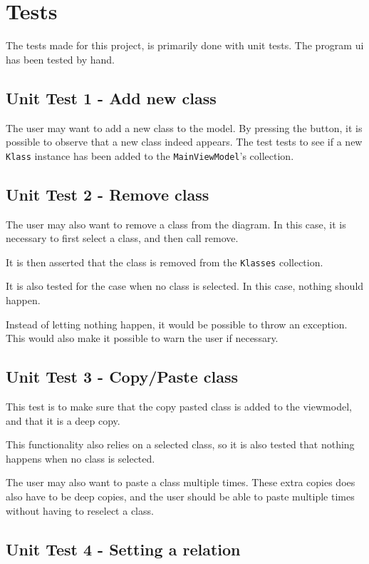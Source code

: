 \section{Tests}

The tests made for this project, is primarily done with unit
tests. The program ui has been tested by hand.

\subsection{Unit Test 1 - Add new class}

The user may want to add a new class to the model. By pressing the button, it is
possible to observe that a new class indeed appears. The test tests to see if a
new \texttt{Klass} instance has been added to the \texttt{MainViewModel}'s
collection.

\subsection{Unit Test 2 - Remove class}

The user may also want to remove a class from the diagram. In this case, it is
necessary to first select a class, and then call remove.

It is then asserted that the class is removed from the \texttt{Klasses}
collection.

It is also tested for the case when no class is selected. In this case, nothing
should happen.

Instead of letting nothing happen, it would be possible to throw an exception.
This would also make it possible to warn the user if necessary.

\subsection{Unit Test 3 - Copy/Paste class}

This test is to make sure that the copy pasted class is added to the viewmodel,
and that it is a deep copy.

This functionality also relies on a selected class, so it is also tested that
nothing happens when no class is selected.

The user may also want to paste a class multiple times. These extra copies does
also have to be deep copies, and the user should be able to paste multiple times
without having to reselect a class.


\subsection{Unit Test 4 - Setting a relation}

